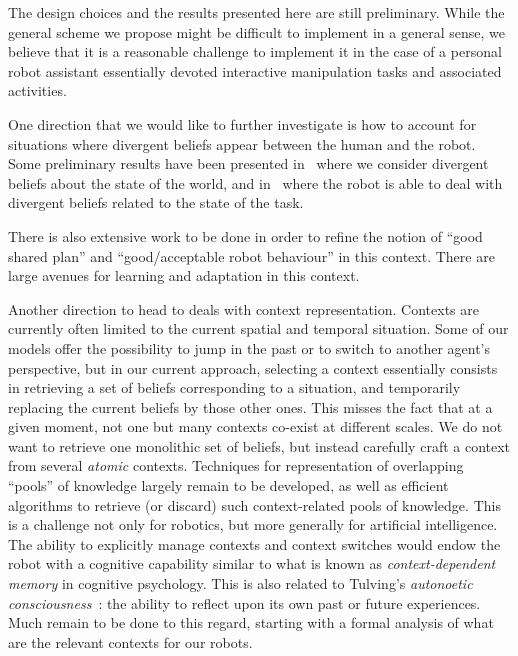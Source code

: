 \documentclass[preprint,3p,times]{elsarticle}
\begin{document}
The design choices and the results presented here are still preliminary.
While the general scheme we propose might be difficult to implement in
a general sense, we believe that it is a reasonable challenge to
implement it in the case of a personal robot assistant essentially
devoted interactive manipulation
tasks and associated activities.

One direction that we would like to further investigate is how to account for
situations where divergent beliefs appear between the human and the robot.
Some preliminary results have been presented 
in~\cite{warnier2012when,milliez2014framework}  where we consider
divergent beliefs about the state of the world, and
in~\cite{devin2016implemented} where the robot is able to deal with
divergent beliefs related to the state of the task.

There is also extensive work to be done in order to refine the notion of ``good
shared plan'' and ``good/acceptable robot behaviour'' in this context. There are
large avenues for learning and adaptation in this context.

Another direction to head to deals with context representation.
Contexts are currently often limited to the current spatial and temporal
situation. Some of our models offer the possibility to jump in the past or to switch to
another agent's perspective, but in our current approach, selecting a context
essentially consists in retrieving a set of beliefs corresponding to a
situation, and temporarily replacing the current beliefs by those other ones.
This misses the fact that at a given moment, not one but many contexts co-exist
at different scales. We do not want to retrieve one monolithic set of beliefs,
but instead carefully craft a context from several \emph{atomic} contexts.
Techniques for representation of overlapping ``pools'' of knowledge largely remain
to be developed, as well as efficient algorithms to retrieve (or discard) such
context-related pools of knowledge. This is a challenge not only for robotics,
but more generally for artificial intelligence.  The ability to explicitly
manage contexts and context switches would endow the robot with a cognitive
capability similar to what is known as \emph{context-dependent memory} in
cognitive psychology. This is also related to Tulving's \emph{autonoetic
consciousness}~\cite{Tulving1985a}: the ability to reflect upon its own past or
future experiences.  Much remain to be done to this regard, starting with a
formal analysis of what are the relevant contexts for our robots.
\end{document}
